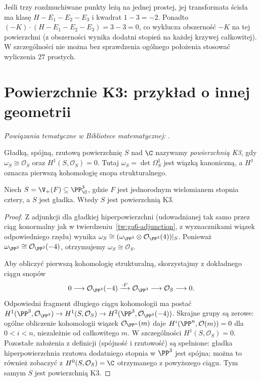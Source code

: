 \begin{uwaga}
Jeśli trzy rozdmuchiwane punkty leżą na jednej prostej,
jej transformata ścisła ma klasę $H-E_1-E_2-E_3$
i kwadrat $1-3=-2$. Ponadto
$(-K)\cdot(H-E_1-E_2-E_3)=3-3=0$,
co wyklucza obszerność $-K$ na tej powierzchni
(z obszerności wynika dodatni stopień na każdej
krzywej całkowitej). W szczególności nie można
bez sprawdzenia ogólnego położenia stosować
wyliczenia $27$ prostych.
\end{uwaga}

\section{Powierzchnie K3: przykład o innej geometrii}
\label{sec:ga6-k3}

\noindent\emph{Powiązania tematyczne w Bibliotece matematycznej:} .


\begin{definicja}[Powierzchnia K3]
Gładką, spójną, rzutową powierzchnię $S$ nad $\C$
nazywamy \emph{powierzchnią K3}, gdy
$\omega_S\cong\mathcal O_S$ oraz
$H^1(S,\mathcal O_S)=0$. Tutaj
$\omega_S=\det\Omega_S^1$ jest wiązką kanoniczną,
a $H^1$ oznacza pierwszą kohomologię snopa strukturalnego.
\end{definicja}

\begin{twierdzenie}
\label{tw:ga6-quartic-k3}
Niech $S=\V_+(F)\subseteq\PP^3_\C$, gdzie $F$
jest jednorodnym wielomianem stopnia cztery, a $S$
jest gładka. Wtedy $S$ jest powierzchnią K3.
\end{twierdzenie}
\begin{proof}
Z adjunkcji dla gładkiej hiperpowierzchni
(udowadnianej tak samo przez ciąg konormalny jak
w twierdzeniu~\ref{tw:ga6-adjunction}, z wyznacznikami
wiązek odpowiedniego rzędu) wynika
$\omega_S\cong(\omega_{\PP^3}\otimes
\mathcal O_{\PP^3}(4))|_S$.
Ponieważ $\omega_{\PP^3}\cong\mathcal O_{\PP^3}(-4)$,
otrzymujemy $\omega_S\cong\mathcal O_S$.

Aby obliczyć pierwszą kohomologię strukturalną,
skorzystajmy z dokładnego ciągu snopów
\[
0\longrightarrow\mathcal O_{\PP^3}(-4)
\xrightarrow{\cdot F}\mathcal O_{\PP^3}
\longrightarrow\mathcal O_S\longrightarrow0.
\]
Odpowiedni fragment długiego ciągu kohomologii ma postać
$H^1(\PP^3,\mathcal O_{\PP^3})\to
H^1(S,\mathcal O_S)\to
H^2(\PP^3,\mathcal O_{\PP^3}(-4))$.
Skrajne grupy są zerowe: ogólne obliczenie kohomologii
wiązek $\mathcal O_{\PP^n}(m)$ daje
$H^i(\PP^n,\mathcal O(m))=0$ dla $0<i<n$,
niezależnie od całkowitego $m$. W szczególności
$H^1(S,\mathcal O_S)=0$.
Pozostałe założenia z definicji (spójność i
rzutowość) są spełnione: gładka hiperpowierzchnia
rzutowa dodatniego stopnia w $\PP^3$ jest spójna;
można to również zobaczyć z
$H^0(S,\mathcal O_S)=\C$ otrzymanego z powyższego
ciągu. Tym samym $S$ jest powierzchnią K3.
\end{proof}

